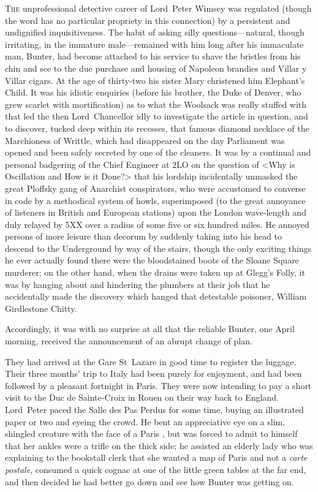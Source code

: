 	
\lettrine{T}{he} unprofessional detective career of Lord~Peter Wimsey was regulated (though the word has no particular propriety in this connection) by a persistent and undignified inquisitiveness. The habit of asking silly questions—natural, though irritating, in the immature male—remained with him long after his immaculate man, Bunter, had become attached to his service to shave the bristles from his chin and see to the due purchase and housing of Napoleon brandies and Villar y Villar cigars. At the age of thirty-two his sister Mary christened him Elephant's Child. It was his idiotic enquiries (before his brother, the Duke of Denver, who grew scarlet with mortification) as to what the Woolsack was really stuffed with that led the then Lord~Chancellor idly to investigate the article in question, and to discover, tucked deep within its recesses, that famous diamond necklace of the Marchioness of Writtle, which had disappeared on the day Parliament was opened and been safely secreted by one of the cleaners. It was by a continual and personal badgering of the Chief Engineer at 2LO on the question of <Why is Oscillation and How is it Done?> that his lordship incidentally unmasked the great Ploffsky gang of Anarchist conspirators, who were accustomed to converse in code by a methodical system of howls, superimposed (to the great annoyance of listeners in British and European stations) upon the London wave-length and duly relayed by 5XX over a radius of some five or six hundred miles. He annoyed persons of more leisure than decorum by suddenly taking into his head to descend to the Underground by way of the stairs, though the only exciting things he ever actually found there were the bloodstained boots of the Sloane Square murderer; on the other hand, when the drains were taken up at Glegg's Folly, it was by hanging about and hindering the plumbers at their job that he accidentally made the discovery which hanged that detestable poisoner, William Girdlestone Chitty.

Accordingly, it was with no surprise at all that the reliable Bunter, one April morning, received the announcement of an abrupt change of plan.

They had arrived at the Gare St~Lazare in good time to register the luggage. Their three months' trip to Italy had been purely for enjoyment, and had been followed by a pleasant fortnight in Paris. They were now intending to pay a short visit to the Duc de Sainte-Croix in Rouen on their way back to England. Lord~Peter paced the Salle des Pas Perdus for some time, buying an illustrated paper or two and eyeing the crowd. He bent an appreciative eye on a slim, shingled creature with the face of a Paris , but was forced to admit to himself that her ankles were a trifle on the thick side; he assisted an elderly lady who was explaining to the bookstall clerk that she wanted a map of Paris and not a \textit{carte postale}, consumed a quick cognac at one of the little green tables at the far end, and then decided he had better go down and see how Bunter was getting on.


